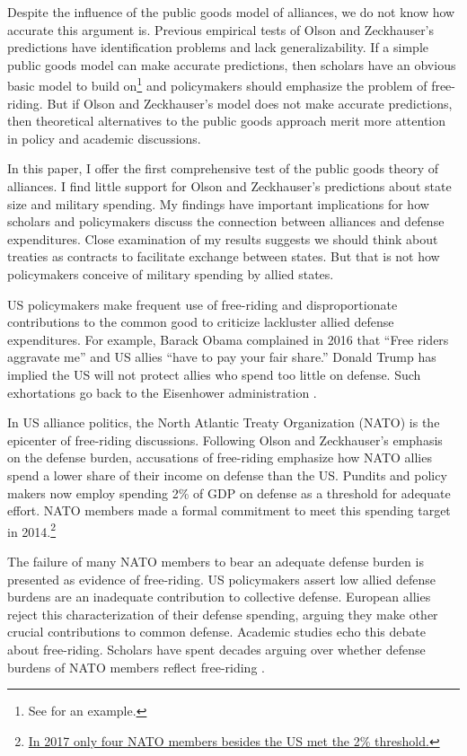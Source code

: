 \documentclass[12pt]{article}
\begin{document}
Despite the influence of the public goods model of alliances, we do not know how accurate this argument is. 
Previous empirical tests of Olson and Zeckhauser's predictions have identification problems and lack generalizability. 
If a simple public goods model can make accurate predictions, then scholars have an obvious basic model to build on\footnote{See \citet{SandlerHartley2001} for an example.} and policymakers should emphasize the problem of free-riding. 
But if Olson and Zeckhauser's model does not make accurate predictions, then theoretical alternatives to the public goods approach merit more attention in policy and academic discussions. 


In this paper, I offer the first comprehensive test of the public goods theory of alliances. 
I find little support for Olson and Zeckhauser's predictions about state size and military spending. 
My findings have important implications for how scholars and policymakers discuss the connection between alliances and defense expenditures. 
Close examination of my results suggests we should think about treaties as contracts to facilitate exchange between states. 
But that is not how policymakers conceive of military spending by allied states. 
 

US policymakers make frequent use of free-riding and disproportionate contributions to the common good to criticize lackluster allied defense expenditures.  
For example, Barack Obama complained in 2016 that ``Free riders aggravate me'' and US allies ``have to pay your fair share.'' 
Donald Trump has implied the US will not protect allies who spend too little on defense. 
Such exhortations go back to the Eisenhower administration \citep{Lanoszka2015}.


In US alliance politics, the North Atlantic Treaty Organization (NATO) is the epicenter of free-riding discussions. 
Following Olson and Zeckhauser's emphasis on the defense burden, accusations of free-riding emphasize how NATO allies spend a lower share of their income on defense than the US. 
Pundits and policy makers now employ spending 2\% of GDP on defense as a threshold for adequate effort.
NATO members made a formal commitment to meet this spending target in 2014.\footnote{
\href{https://www.economist.com/graphic-detail/2017/02/16/military-spending-by-nato-members}{In 2017 only four NATO members besides the US met the 2\% threshold.}}  


The failure of many NATO members to bear an adequate defense burden is presented as evidence of free-riding. 
US policymakers assert low allied defense burdens are an inadequate contribution to collective defense. 
European allies reject this characterization of their defense spending, arguing they make other crucial contributions to common defense. 
Academic studies echo this debate about free-riding.  
Scholars have spent decades arguing over whether defense burdens of NATO members reflect free-riding \citep{SandlerForbes1980, Palmer1990, GatesTerasawa1992, SandlerHartley2001, Lanoszka2015, PluemperNeumayer2015}.
\end{document}
